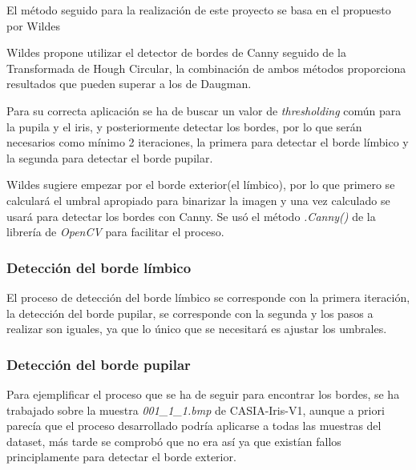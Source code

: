 El método seguido para la realización de este proyecto se basa en el propuesto por Wildes ~\cite{ganorkar:2007}

Wildes propone utilizar el detector de bordes de Canny seguido de la Transformada de Hough Circular, la combinación de ambos métodos proporciona resultados que pueden superar a los de Daugman.

Para su correcta aplicación se ha de buscar un valor de \emph{thresholding} común para la pupila y el iris, y posteriormente detectar los bordes, por lo que serán necesarios como mínimo 2 iteraciones, la primera para detectar el borde límbico y la segunda para detectar el borde pupilar.

Wildes sugiere empezar por el borde exterior(el límbico), por lo que primero se calculará el umbral apropiado para binarizar la imagen y una vez calculado se usará para detectar los bordes con Canny.
Se usó el método \emph{.Canny()} de la librería de 
\emph{OpenCV} para facilitar el proceso.

\subsubsection{Detección del borde límbico}


El proceso de detección del borde límbico se corresponde con la primera iteración, la detección del borde pupilar, se corresponde con la segunda y los pasos a realizar son iguales, ya que  lo único que se necesitará es ajustar los umbrales.

\subsubsection{Detección del borde pupilar}




Para ejemplificar el proceso que se ha de seguir para encontrar los bordes, se ha trabajado sobre la muestra \emph{001\_1\_1.bmp} de CASIA-Iris-V1, aunque a priori parecía que el proceso desarrollado podría aplicarse a todas las muestras del dataset, más tarde se comprobó que no era así ya que existían fallos principlamente para detectar el borde exterior.
